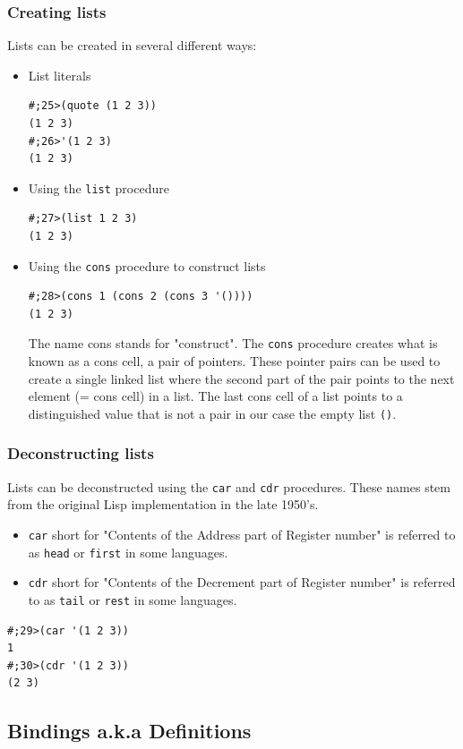 \documentclass[12pt,a4paper,english,twoside]{article}
\begin{document}
\subsubsection{Creating lists}
Lists can be created in several different ways:
\begin{itemize}
\item List literals 
\begin{lstlisting}
#;25>(quote (1 2 3))
(1 2 3)
#;26>'(1 2 3)
(1 2 3)
\end{lstlisting}
\item Using the \texttt{list} procedure
\begin{lstlisting}
#;27>(list 1 2 3)
(1 2 3)
\end{lstlisting}
\item Using the \texttt{cons} procedure to construct lists  
\begin{lstlisting}
#;28>(cons 1 (cons 2 (cons 3 '())))
(1 2 3)
\end{lstlisting}
The name cons stands for "construct". The \texttt{cons} procedure creates what is known as a cons cell, a pair of pointers. These pointer pairs can be used to create a single linked list where the second part of the pair points to the next element (= cons cell) in a list. The last cons cell of a list points to a distinguished value that is not a pair in our case the empty list \texttt{()}. 
\end{itemize}
\subsubsection{Deconstructing lists}
Lists can be deconstructed using the \texttt{car} and \texttt{cdr} procedures. These names stem from the original Lisp implementation in the late 1950's. 
\begin{itemize}
\item \texttt{car} short for "Contents of the Address part of Register number" is referred to as \texttt{head} or \texttt{first} in some languages.
\item \texttt{cdr} short for "Contents of the Decrement part of Register number" is referred to as \texttt{tail} or \texttt{rest} in some languages.
\end{itemize} 
\begin{lstlisting}
#;29>(car '(1 2 3))
1
#;30>(cdr '(1 2 3))
(2 3)
\end{lstlisting}
\subsection{Bindings a.k.a Definitions}
\end{document}
